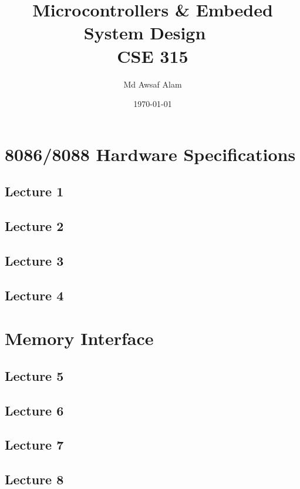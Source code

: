 \documentclass{book}
\title{Microcontrollers \& Embeded System Design ~\textbf{\\CSE 315}}
\author{Md Awsaf Alam}
\date{\today}
\begin{document}
\maketitle

\tableofcontents


\part{8086/8088 Hardware Specifications}
\chapter{Lecture 1}


\chapter{Lecture 2}


\chapter{Lecture 3}


\chapter{Lecture 4}


\part{Memory Interface}
\chapter{Lecture 5}


\chapter{Lecture 6}


\chapter{Lecture 7}


\chapter{Lecture 8}

\end{document}
